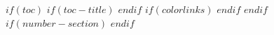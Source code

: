 $if(toc)$
  $if(toc-title)$
  \renewcommand*\contentsname{$toc-title$}
$endif$
  $if(colorlinks)$
  \hypersetup{linkcolor=$if(toccolor)$$toccolor$$else$$endif$}
$endif$
  \setcounter{tocdepth}{$toc-depth$}
$endif$
$if(number-section)$
  \setcounter{numberdepth}{$number-depth$}
$endif$
  \renewcommand*\listfigurename{List of figures}
\renewcommand*\listtablename{List of tables}